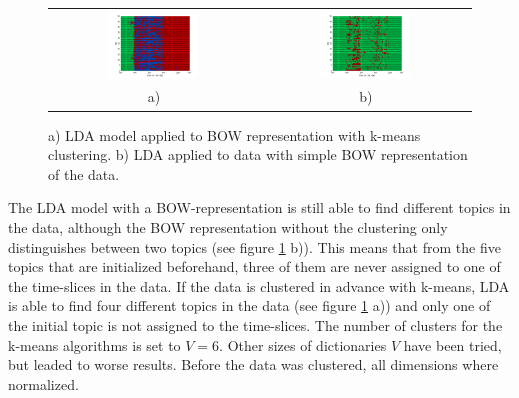 \begin{figure}
 \centering
 \begin{tabular}{c c}
  \centering
  \includegraphics[width=0.45\textwidth]{Pictures/DayTopicsTs96k5Clus.png}
  &
  \includegraphics[width=0.45\textwidth]{Pictures/DayTopicsTs96k5bow.png}\\
  a) & b)
 \end{tabular}
 \caption{a) LDA model applied to BOW representation with k-means clustering. b) LDA applied to data with simple BOW representation of the data.}
 \label{fig:BOWtopics}
\end{figure}

\pagebreak
 
The LDA model with a BOW-representation is still able to find different topics in the data, although the BOW representation without the clustering only distinguishes between two topics (see figure \ref{fig:BOWtopics} b)). This means that from the five topics that are initialized beforehand, three of them are never assigned to one of the time-slices in the data. If the data is clustered in advance with k-means, LDA is able to find four different topics in the data (see figure \ref{fig:BOWtopics} a)) and only one of the initial topic is not assigned to the time-slices. The number of clusters for the k-means algorithms is set to $V=6$. Other sizes of dictionaries $V$ have been tried, but leaded to worse results. Before the data was clustered, all dimensions where normalized.\\

